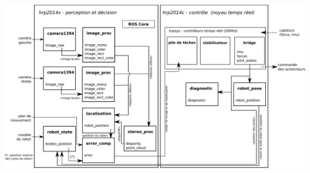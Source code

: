 \documentclass[14pt,utf8,hyperref={pdfpagelabels=false}]{beamer}
\begin{document}

\begin{frame}[plain]
  \begin{changemargin}{-1cm}{-1cm}
    \begin{center}
      \vspace{-0.1cm}
      \includegraphics[width=.95\paperwidth,height=\paperheight,%
        keepaspectratio]{src/chap4-integration/archi.pdf}
    \end{center}
  \end{changemargin}
\end{frame}


%
%


\end{document}
